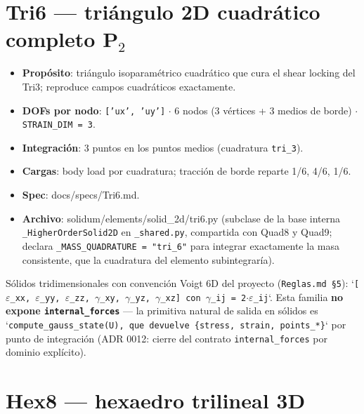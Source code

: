 \documentclass[11pt,letterpaper,oneside]{report}
\begin{document}
\section{Tri6 --- triángulo 2D cuadrático completo P\ensuremath{_{2}}}

\begin{itemize}
  \item \textbf{Propósito}: triángulo isoparamétrico cuadrático que cura el shear locking del Tri3; reproduce campos cuadráticos exactamente.
  \item \textbf{DOFs por nodo}: \texttt{['ux', 'uy']} \ensuremath{\cdot} 6 nodos (3 vértices + 3 medios de borde) \ensuremath{\cdot} \texttt{STRAIN\_DIM = 3}.
  \item \textbf{Integración}: 3 puntos en los puntos medios (cuadratura \texttt{tri\_3}).
  \item \textbf{Cargas}: body load por cuadratura; tracción de borde reparte 1/6, 4/6, 1/6.
  \item \textbf{Spec}: docs/specs/Tri6.md.
  \item \textbf{Archivo}: solidum/elements/solid\_2d/tri6.py (subclase de la base interna \texttt{\_HigherOrderSolid2D} en \texttt{\_shared.py}, compartida con Quad8 y Quad9; declara \texttt{\_MASS\_QUADRATURE = "tri\_6"} para integrar exactamente la masa consistente, que la cuadratura del elemento subintegraría).
\end{itemize}


Sólidos tridimensionales con convención Voigt 6D del proyecto (\texttt{Reglas.md §5}):
`\texttt{[\ensuremath{\varepsilon}\_xx, \ensuremath{\varepsilon}\_yy, \ensuremath{\varepsilon}\_zz, \ensuremath{\gamma}\_xy, \ensuremath{\gamma}\_yz, \ensuremath{\gamma}\_xz]}\texttt{ con }\texttt{\ensuremath{\gamma}\_ij = 2\ensuremath{\cdot}\ensuremath{\varepsilon}\_ij}`. Esta familia
\textbf{no expone \texttt{internal\_forces}} --- la primitiva natural de salida en sólidos
es `\texttt{compute\_gauss\_state(U)}\texttt{, que devuelve }\texttt{\{stress, strain, points\_*\}}`
por punto de integración (ADR 0012: cierre del contrato \texttt{internal\_forces}
por dominio explícito).

\section{Hex8 --- hexaedro trilineal 3D}
\end{document}
